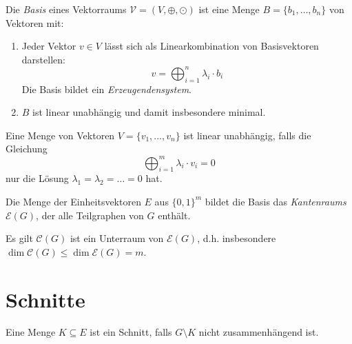 \begin{definition}[Basis]
    Die \textit{Basis} eines Vektorraums $ \mathcal{V} = (V, \oplus, \odot) $ ist eine Menge $ B = \{ b_1, \dots, b_n \}$ von Vektoren mit:
    \begin{enumerate}
        \item Jeder Vektor $ v \in V $ lässt sich als Linearkombination von Basisvektoren darstellen:
        \begin{equation*}
            v = \bigoplus_{i = 1}^n \lambda_i \cdot b_i
        \end{equation*}
        Die Basis bildet ein \textit{Erzeugendensystem}.

        \item $ B $ ist linear unabhängig und damit insbesondere minimal.
    \end{enumerate}
\end{definition}

\begin{definition}
    Eine Menge von Vektoren $ V = \{ v_1, \dots, v_n \} $ ist linear unabhängig, falls die Gleichung
    \begin{equation*}
        \bigoplus_{i = 1}^m \lambda_i \cdot v_i = 0
    \end{equation*}
    nur die Lösung $ \lambda_1 = \lambda_2 = \dots = 0 $ hat.
\end{definition}

\begin{definition}[Kantenraum]
    Die Menge der Einheitsvektoren $ E $ aus $ \{ 0, 1\}^m $ bildet die Basis das \textit{Kantenraums} $ \mathcal{E}(G) $, der alle Teilgraphen von $ G $ enthält.
\end{definition}

\begin{proposition}
    Es gilt $ \mathcal{C}(G) $ ist ein Unterraum von $ \mathcal{E}(G) $, d.h. insbesondere $ \dim \mathcal{C}(G) \leq \dim \mathcal{E}(G) = m $.
\end{proposition}

\section{Schnitte}

\begin{definition}[Schnitt]
    Eine Menge $ K \subseteq E $ ist ein Schnitt, falls $ G \setminus K $ nicht zusammenhängend ist.
\end{definition}

